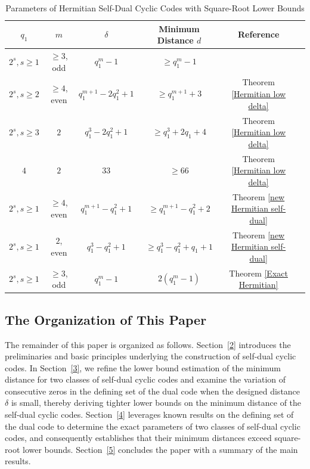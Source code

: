 \documentclass[10pt,a4paper]{amsart}
\begin{document}
\begin{table}[htbp]
    \centering
    \caption{Parameters of Hermitian Self-Dual Cyclic Codes with Square-Root Lower Bounds }
    \label{Parameters of Hermitian Self-Dual Cyclic Codes}
    \begin{tabular}{c c c c c c}
        \hline
        $q_1$ & $m$ & $\delta$ & Minimum Distance $d$ & Reference \\
        \hline
        $2^s,s\ge1$ & $\ge3$, odd & $q_1^m-1$ & $\ge q_1^m-1$ & \cite{10856234} \\
        $2^s,s\ge2$ & $\ge 4$, even & $q_1^{m+1}-2q_1^2+1$ & $\ge q_1^{m+1}+3$ & Theorem \ref{Hermitian low delta} \\
        $2^s, s\ge 3$ & $2$ & $q_1^3-2q_1^2+1$ & $\ge q_1^3+2q_1+4$ & Theorem \ref{Hermitian low delta} \\
        $4$ & $2$ & $33$ & $\ge 66$ & Theorem \ref{Hermitian low delta} \\
        $2^s,s\ge1$ & $\ge 4$, even & $q_1^{m+1}-q_1^2+1$ & $\ge q_1^{m+1}-q_1^2+2$ & Theorem \ref{new Hermitian self-dual} \\
        $2^s,s\ge1$ & $2$, even & $q_1^3-q_1^2+1$ & $\ge q_1^{3}-q_1^2+q_1+1$ & Theorem \ref{new Hermitian self-dual} \\
        $2^s,s\ge1$ & $\ge3$, odd & $q_1^m-1$ & $2(q_1^m-1)$ & Theorem \ref{Exact Hermitian} \\
        \hline
    \end{tabular}
\end{table}

\subsection{The Organization of This Paper}

The remainder of this paper is organized as follows. Section~\ref{2} introduces the preliminaries and basic principles underlying the construction of self-dual cyclic codes. In Section~\ref{3}, we refine the lower bound estimation of the minimum distance for two classes of self-dual cyclic codes and examine the variation of consecutive zeros in the defining set of the dual code when the designed distance $\delta$ is small, thereby deriving tighter lower bounds on the minimum distance of the self-dual cyclic codes. Section~\ref{4} leverages known results on the defining set of the dual code to determine the exact parameters of two classes of self-dual cyclic codes, and consequently establishes that their minimum distances exceed square-root lower bounds. Section~\ref{5} concludes the paper with a summary of the main results.
\end{document}
